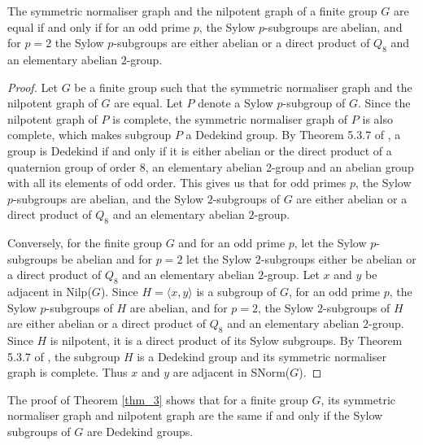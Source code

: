 \begin{thm}
    The symmetric normaliser graph and the nilpotent graph of a finite group $G$ are equal if and only if for an odd prime $p$, the Sylow $p$-subgroups are abelian, and for $p=2$ the Sylow $p$-subgroups are either abelian or a direct product of $Q_8$ and an elementary abelian $2$-group.
\end{thm}
\begin{proof}
    Let $G$ be a finite group such that the symmetric normaliser graph and the nilpotent graph of $G$ are equal. Let $P$ denote a Sylow $p$-subgroup of $G$. Since the nilpotent graph of $P$ is complete, the symmetric normaliser graph of $P$ is also complete, which makes subgroup $P$ a Dedekind group. By Theorem 5.3.7 of \cite{DJSR1996}, a group is Dedekind if and only if it is either abelian or the direct product of a quaternion group of order 8, an elementary abelian 2-group and an abelian group with all its elements of odd order. This gives us that for odd primes $p$, the Sylow $p$-subgroups are abelian, and the Sylow $2$-subgroups of $G$ are either abelian or a direct product of $Q_8$ and an elementary abelian $2$-group.
    \par
    Conversely, for the finite group $G$ and for an odd prime $p$, let the Sylow $p$-subgroups be abelian and for $p=2$ let the Sylow $2$-subgroups either be abelian or a direct product of $Q_8$ and an elementary abelian $2$-group. Let $x$ and $y$ be adjacent in Nilp($G$). Since $H=\langle x,y \rangle$ is a subgroup of $G$, for an odd prime $p$, the Sylow $p$-subgroups of $H$ are abelian, and for $p=2$, the Sylow $2$-subgroups of $H$ are either abelian or a direct product of $Q_8$ and an elementary abelian $2$-group. Since $H$ is nilpotent, it is a direct product of its Sylow subgroups. By Theorem 5.3.7 of \cite{DJSR1996}, the subgroup $H$ is a Dedekind group and its symmetric normaliser graph is complete. Thus $x$ and $y$ are adjacent in SNorm($G$).
\end{proof}
The proof of Theorem \ref{thm_3} shows that for a finite group $G$, its symmetric normaliser graph and nilpotent graph are the same if and only if the Sylow subgroups of $G$ are Dedekind groups. 

